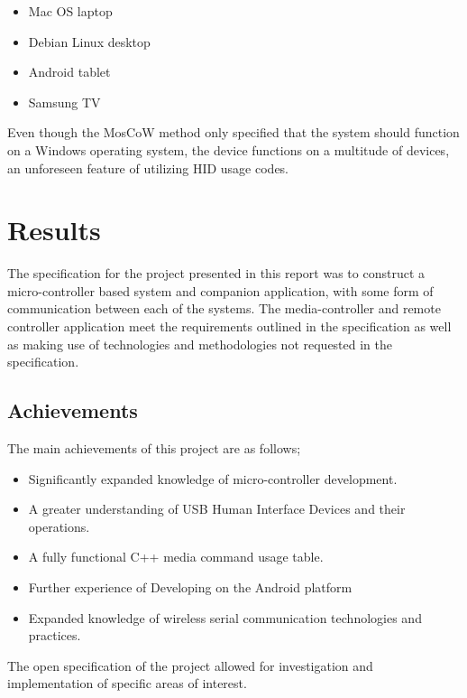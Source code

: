 \documentclass{article}
\begin{document}
		\begin{itemize}
			\item Mac OS laptop
			\item Debian Linux desktop
			\item Android tablet
			\item Samsung TV
		\end{itemize}
		
		\noindent
		Even though the MosCoW method only specified that the system should function on a Windows operating system, the device functions on a multitude of devices, an unforeseen feature of utilizing HID usage codes.
			
	\section{Results}
		The specification for the project presented in this report was to construct a micro-controller based system and companion application, with some form of communication between each of the systems. The media-controller and remote controller application meet the requirements outlined in the specification as well as making use of technologies and methodologies not requested in the specification.
			
		\subsection{Achievements}
			The main achievements of this project are as follows;
			
			\begin{itemize}
				\item Significantly expanded knowledge of micro-controller development.
				\item A greater understanding of USB Human Interface Devices and their operations.
				\item A fully functional C++ media command usage table.
				\item Further experience of Developing on the Android platform
				\item Expanded knowledge of wireless serial communication technologies and practices.
			\end{itemize}
			
			\noindent
			The open specification of the project allowed for investigation and implementation of specific areas of interest. 
			
\end{document}
